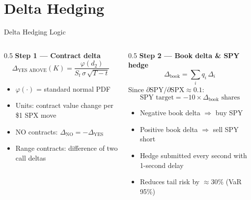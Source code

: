 \documentclass[aspectratio=169]{beamer}
\begin{document}
\section{Delta Hedging}

\begin{frame}{Delta Hedging Logic}
  \begin{columns}[T]
    \begin{column}{0.5\textwidth}
      \textbf{Step 1 --- Contract delta}
      \[
        \Delta_{\text{YES ABOVE}}(K) = \frac{\varphi(d_2)}{S_t\,\sigma\,\sqrt{T-t}}
      \]
      \vspace{-0.4cm}
      \begin{itemize}\small
        \item $\varphi(\cdot)$ = standard normal PDF
        \item Units: contract value change per \$1 SPX move
        \item NO contracts: $\Delta_{\text{NO}} = -\Delta_{\text{YES}}$
        \item Range contracts: difference of two call deltas
      \end{itemize}
    \end{column}
    \begin{column}{0.5\textwidth}
      \textbf{Step 2 --- Book delta \& SPY hedge}
      \[
        \Delta_{\text{book}} = \sum_i q_i \,\Delta_i
      \]
      Since $\partial\text{SPY}/\partial\text{SPX} \approx 0.1$:
      \[
        \text{SPY target} = -10 \times \Delta_{\text{book}} \text{ shares}
      \]
      \vspace{-0.6cm}
      \begin{itemize}\small
        \item Negative book delta $\Rightarrow$ buy SPY
        \item Positive book delta $\Rightarrow$ sell SPY short
        \item Hedge submitted every second with 1-second delay
        \item Reduces tail risk by $\approx 30\%$ (VaR 95\%)
      \end{itemize}
    \end{column}
  \end{columns}
\end{frame}
\end{document}
